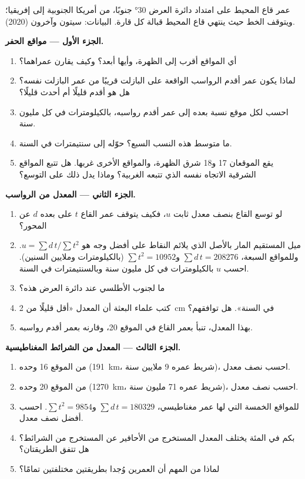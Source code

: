 \begin{problem}
\begin{center}
{\small عمر قاع المحيط على امتداد دائرة العرض \ang{30} جنوبًا، من
أمريكا الجنوبية إلى إفريقيا؛ ويتوقف الخط حيث ينتهي قاع المحيط قبالة
كل قارة. البيانات: سيتون وآخرون (2020).}
\end{center}

\medskip
\noindent\textbf{الجزء الأول --- مواقع الحفر.}
\begin{enumerate}
  \item أي المواقع أقرب إلى الظهرة، وأيها أبعد؟ وكيف
        يقارن عمراهما؟
  \item لماذا يكون عمر أقدم الرواسب الواقعة على البازلت قريبًا من
        عمر البازلت نفسه؟ هل هو أقدم قليلًا أم أحدث
        قليلًا؟
  \item احسب لكل موقع نسبة بعده إلى عمر أقدم
        رواسبه، بالكيلومترات في كل مليون سنة.
  \item ما متوسط هذه النسب السبع؟ حوّله إلى سنتيمترات في
        السنة.
  \item يقع الموقعان 17 و18 شرق الظهرة، والمواقع الأخرى غربها. هل
        تتبع المواقع الشرقية الاتجاه نفسه الذي تتبعه الغربية؟ وماذا يدل
        ذلك على التوسع؟
\end{enumerate}

\medskip
\noindent\textbf{الجزء الثاني --- المعدل من الرواسب.}
\begin{enumerate}[resume]
  \item لو توسع القاع بنصف معدل ثابت $u$، فكيف يتوقف عمر
        القاع $t$ على بعده $d$ عن المحور؟
  \item ميل المستقيم المار بالأصل الذي يلائم النقاط على أفضل وجه هو
        $u = \sum d\,t / \sum t^2$. وللمواقع السبعة،
        $\sum d\,t = \num{208276}$ و$\sum t^2 = \num{10952}$ (بالكيلومترات
        وملايين السنين). احسب $u$ بالكيلومترات في كل
        مليون سنة وبالسنتيمترات في السنة.
  \item ما  لجنوب الأطلسي عند دائرة العرض
        هذه؟
  \item كتب علماء البعثة أن المعدل «أقل قليلًا
        من \qty{2}{cm} في السنة». هل توافقهم؟
  \item بهذا المعدل، تنبأ بعمر القاع في الموقع 20، وقارنه
        بعمر أقدم رواسبه.
\end{enumerate}

\medskip
\noindent\textbf{الجزء الثالث --- المعدل من الشرائط المغناطيسية.}
\begin{enumerate}[resume]
  \item من الموقع 16 وحده (\qty{191}{km}، شريط عمره 9 ملايين سنة)،
        احسب نصف معدل.
  \item من الموقع 20 وحده (\qty{1270}{km}، شريط عمره 71 مليون سنة)،
        احسب نصف معدل.
  \item للمواقع الخمسة التي لها عمر مغناطيسي، $\sum d\,t = \num{180329}$
        و$\sum t^2 = \num{9854}$. احسب أفضل نصف معدل.
  \item بكم في المئة يختلف المعدل المستخرج من الأحافير عن المستخرج من
        الشرائط؟ هل تتفق الطريقتان؟
  \item لماذا من المهم أن العمرين وُجدا بطريقتين
        مختلفتين تمامًا؟
\end{enumerate}


\end{problem}
